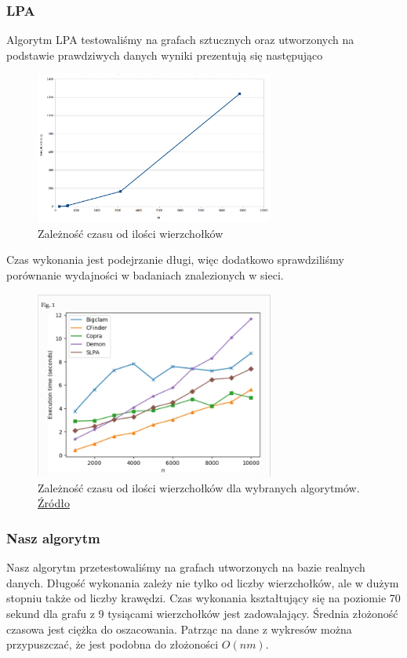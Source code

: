 \documentclass{article}
\begin{document}
\subsubsection{LPA}
Algorytm LPA testowaliśmy na grafach sztucznych oraz utworzonych na podstawie prawdziwych danych wyniki prezentują się następująco

\begin{figure}[H]
    \centering
    \includegraphics[width=0.7\textwidth]{images/lpa_vert.png}
    \caption{Zależność czasu od ilości wierzchołków}
    \label{fig:my_label}
\end{figure}

Czas wykonania jest podejrzanie długi, więc dodatkowo sprawdziliśmy porównanie wydajności w badaniach znalezionych w sieci.

\begin{figure}[H]
    \centering
    \includegraphics[width=0.7\textwidth]{images/other_vert.png}
    \caption{Zależność czasu od ilości wierzchołków dla wybranych algorytmów. 
            \href{https://appliednetsci.springeropen.com/articles/10.1007/s41109-020-00289-9}{Źródło}}
    \label{fig:my_label}
\end{figure}

\subsubsection{Nasz algorytm}
Nasz algorytm przetestowaliśmy na grafach utworzonych na bazie realnych danych. Długość wykonania zależy nie tylko od liczby wierzchołków, ale w dużym stopniu także od liczby krawędzi. Czas wykonania kształtujący się na poziomie 70 sekund dla grafu z 9 tysiącami wierzchołków jest zadowalający. Średnia złożoność czasowa jest ciężka do oszacowania. Patrząc na dane z wykresów można przypuszczać, że jest podobna do złożoności $O(nm)$.
\end{document}
